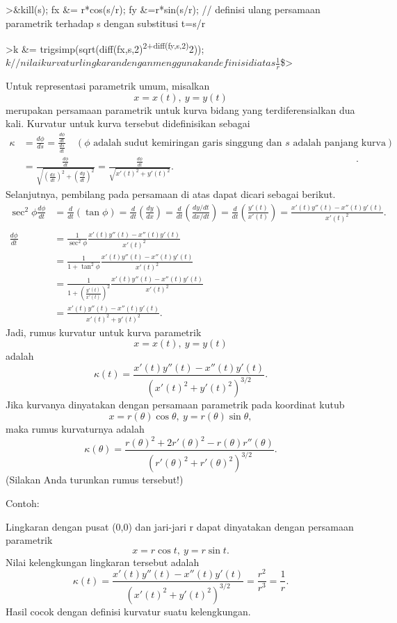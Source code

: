 \documentclass[
]{book}
\begin{document}
\textgreater\&kill(s); fx \&= r*cos(s/r); fy \&=r*sin(s/r); // definisi ulang persamaan parametrik terhadap s dengan substitusi t=s/r

\textgreater k \&= trigsimp(sqrt(diff(fx,s,2)\textsuperscript{2+diff(fy,s,2)}2)); \(k // nilai kurvatur lingkaran dengan menggunakan definisi di atas\)\(\frac{1}{r}\)\$\textgreater{}

Untuk representasi parametrik umum, misalkan \[x = x(t),\ y= y(t)\]merupakan persamaan parametrik untuk kurva bidang yang terdiferensialkan dua kali. Kurvatur untuk kurva tersebut didefinisikan sebagai \[\begin{aligned}\kappa &= \frac{d\phi}{ds}=\frac{\frac{d\phi}{dt}}{\frac{ds}{dt}}\quad (\phi \text{ adalah sudut kemiringan garis singgung dan }s \text{ adalah panjang kurva})\\ &=\frac{\frac{d\phi}{dt}}{\sqrt{(\frac{dx}{dt})^2+(\frac{dy}{dt})^2}}= \frac{\frac{d\phi}{dt}}{\sqrt{x'(t)^2+y'(t)^2}}.\end{aligned}.\]Selanjutnya, pembilang pada persamaan di atas dapat dicari sebagai berikut. \[\begin{aligned}\sec^2\phi\frac{d\phi}{dt} &= \frac{d}{dt}\left(\tan\phi\right)= \frac{d}{dt}\left(\frac{dy}{dx}\right)= \frac{d}{dt}\left(\frac{dy/dt}{dx/dt}\right)= \frac{d}{dt}\left(\frac{y'(t)}{x'(t)}\right)=\frac{x'(t)y''(t)-x''(t)y'(t)}{x'(t)^2}.\\ & \\ \frac{d\phi}{dt} &= \frac{1}{\sec^2\phi}\frac{x'(t)y''(t)-x''(t)y'(t)}{x'(t)^2}\\ &= \frac{1}{1+\tan^2\phi}\frac{x'(t)y''(t)-x''(t)y'(t)}{x'(t)^2}\\ &= \frac{1}{1+\left(\frac{y'(t)}{x'(t)}\right)^2}\frac{x'(t)y''(t)-x''(t)y'(t)}{x'(t)^2}\\ &= \frac{x'(t)y''(t)-x''(t)y'(t)}{x'(t)^2+y'(t)^2}.\end{aligned}\]Jadi, rumus kurvatur untuk kurva parametrik \[x=x(t),\ y=y(t)\]adalah \[\kappa(t) = \frac{x'(t)y''(t)-x''(t)y'(t)}{\left(x'(t)^2+y'(t)^2\right)^{3/2}}.\]Jika kurvanya dinyatakan dengan persamaan parametrik pada koordinat kutub \[x=r(\theta)\cos\theta,\ y=r(\theta)\sin\theta,\]maka rumus kurvaturnya adalah \[\kappa(\theta) = \frac{r(\theta)^2+2r'(\theta)^2-r(\theta)r''(\theta)}{\left(r'(\theta)^2+r'(\theta)^2\right)^{3/2}}.\](Silakan Anda turunkan rumus tersebut!)

Contoh:

Lingkaran dengan pusat (0,0) dan jari-jari r dapat dinyatakan dengan persamaan parametrik \[x=r\cos t,\ y=r\sin t.\]Nilai kelengkungan lingkaran tersebut adalah \[\kappa(t)=\frac{x'(t)y''(t)-x''(t)y'(t)}{\left(x'(t)^2+y'(t)^2\right)^{3/2}}=\frac{r^2}{r^3}=\frac 1 r.\]Hasil cocok dengan definisi kurvatur suatu kelengkungan.
\end{document}
